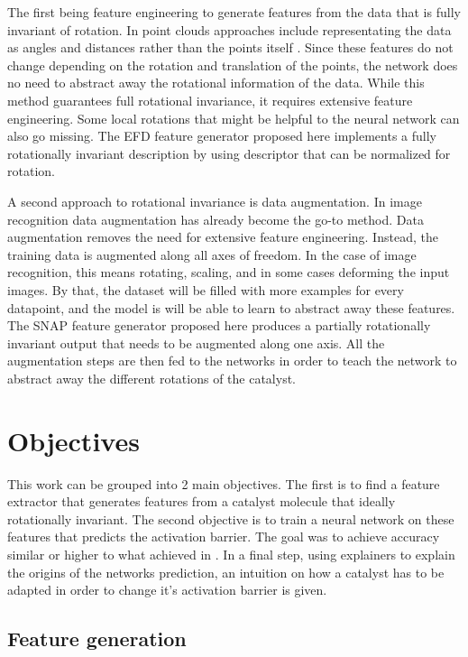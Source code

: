 The first being feature engineering to generate features from the data that is fully invariant of rotation.
In point clouds approaches include representating the data as angles and distances rather than the points itself \cite{8886052,weiler20183d}.
Since these features do not change depending on the rotation and translation of the points, the network does no need to 
abstract away the rotational information of the data.
While this method guarantees full rotational invariance, it requires extensive feature engineering.
Some local rotations that might be helpful to the neural network can also go missing. %
The EFD feature generator proposed here implements a fully rotationally invariant description by using 
descriptor that can be normalized for rotation.

A second approach to rotational invariance is data augmentation.
In image recognition data augmentation has already become the go-to method.
Data augmentation removes the need for extensive feature engineering.
Instead, the training data is augmented along all axes of freedom.
In the case of image recognition, this means rotating, scaling, and in some cases deforming the input images.
By that, the dataset will be filled with more examples for every datapoint, and the model is will be able to learn to 
abstract away these features. %
The SNAP feature generator proposed here produces a partially rotationally invariant output that needs to be augmented along one axis.
All the augmentation steps are then fed to the networks in order to teach the network to abstract away the different rotations of the catalyst.

\section{Objectives}

This work can be grouped into 2 main objectives. 
The first is to find a feature extractor that generates features from a catalyst molecule that ideally rotationally invariant.
The second objective is to train a neural network on these features that predicts the activation barrier.
The goal was to achieve accuracy similar or higher to what \citeauthor{friederich_dos} achieved in \cite{friederich_dos}.
In a final step, using explainers to explain the origins of the networks prediction, an intuition on how a catalyst has 
to be adapted in order to change it's activation barrier is given.

\subsection{Feature generation}

